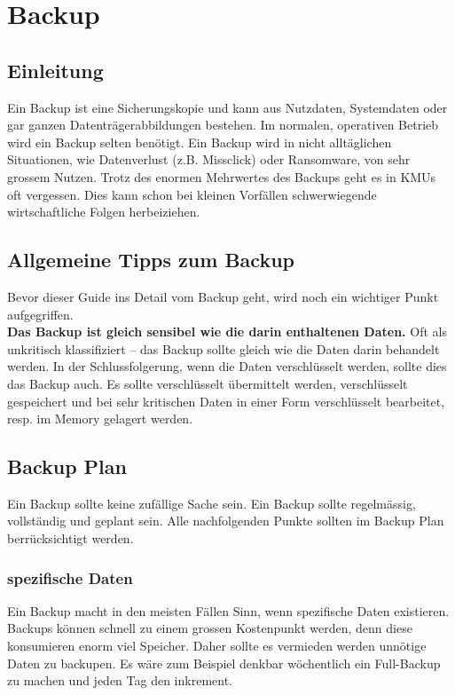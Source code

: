 \chapter{Backup}

\section{Einleitung}
Ein Backup ist eine Sicherungskopie und kann aus Nutzdaten, Systemdaten oder gar ganzen Datenträgerabbildungen bestehen.
Im normalen, operativen Betrieb wird ein Backup selten benötigt.
Ein Backup wird in nicht alltäglichen Situationen, wie Datenverlust (z.B. Missclick) oder Ransomware, von sehr grossem Nutzen.
Trotz des enormen Mehrwertes des Backups geht es in KMUs oft vergessen.
Dies kann schon bei kleinen Vorfällen schwerwiegende wirtschaftliche Folgen herbeiziehen.




\section{Allgemeine Tipps zum Backup}
Bevor dieser Guide ins Detail vom Backup geht, wird noch ein wichtiger Punkt aufgegriffen.\\

\textbf{Das Backup ist gleich sensibel wie die darin enthaltenen Daten.}
Oft als unkritisch klassifiziert -- das Backup sollte gleich wie die Daten darin behandelt werden.
In der Schlussfolgerung, wenn die Daten verschlüsselt werden, sollte dies das Backup auch.
Es sollte verschlüsselt übermittelt werden, verschlüsselt gespeichert und bei sehr kritischen Daten in einer Form verschlüsselt bearbeitet, resp. im Memory gelagert werden.

\section{Backup Plan}
Ein Backup sollte keine zufällige Sache sein.
Ein Backup sollte regelmässig, vollständig und geplant sein.
Alle nachfolgenden Punkte sollten im Backup Plan berrücksichtigt werden.



\subsection{spezifische Daten}
Ein Backup macht in den meisten Fällen Sinn, wenn spezifische Daten existieren.
Backups können schnell zu einem grossen Kostenpunkt werden, denn diese konsumieren enorm viel Speicher.
Daher sollte es vermieden werden unnötige Daten zu backupen.
Es wäre zum Beispiel denkbar wöchentlich ein Full-Backup zu machen und jeden Tag den inkrement.\\


